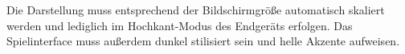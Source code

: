 Die Darstellung \gls{muss} entsprechend der Bildschirmgröße automatisch skaliert werden und lediglich im Hochkant-Modus des Endgeräts erfolgen.
Das Spielinterface \gls{muss} außerdem dunkel stilisiert sein und helle Akzente aufweisen.